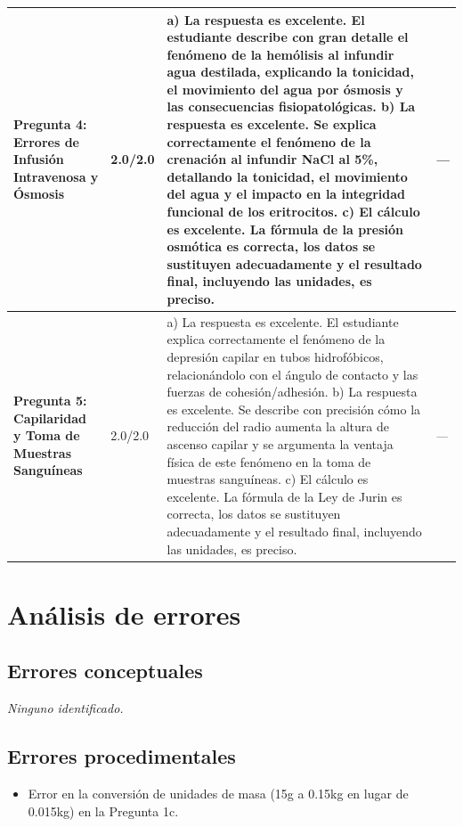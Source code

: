 \documentclass[11pt,a4paper]{article}
\begin{document}
\begin{longtable}{>{\bfseries}p{2.8cm} p{1.6cm} p{7.0cm} p{2.8cm}}
    \midrule
    \textbf{Pregunta 4: Errores de Infusión Intravenosa y Ósmosis} & 2.0/2.0 & a) La respuesta es excelente. El estudiante describe con gran detalle el fenómeno de la hemólisis al infundir agua destilada, explicando la tonicidad, el movimiento del agua por ósmosis y las consecuencias fisiopatológicas. 
b) La respuesta es excelente. Se explica correctamente el fenómeno de la crenación al infundir NaCl al 5\%, detallando la tonicidad, el movimiento del agua y el impacto en la integridad funcional de los eritrocitos. 
c) El cálculo es excelente. La fórmula de la presión osmótica es correcta, los datos se sustituyen adecuadamente y el resultado final, incluyendo las unidades, es preciso. & \textit{---} \\
    \midrule
    \textbf{Pregunta 5: Capilaridad y Toma de Muestras Sanguíneas} & 2.0/2.0 & a) La respuesta es excelente. El estudiante explica correctamente el fenómeno de la depresión capilar en tubos hidrofóbicos, relacionándolo con el ángulo de contacto y las fuerzas de cohesión/adhesión. 
b) La respuesta es excelente. Se describe con precisión cómo la reducción del radio aumenta la altura de ascenso capilar y se argumenta la ventaja física de este fenómeno en la toma de muestras sanguíneas. 
c) El cálculo es excelente. La fórmula de la Ley de Jurin es correcta, los datos se sustituyen adecuadamente y el resultado final, incluyendo las unidades, es preciso. & \textit{---} \\
    \midrule
\end{longtable}

\section*{Análisis de errores}

\subsection*{Errores conceptuales}
\textit{Ninguno identificado.}

\subsection*{Errores procedimentales}
\begin{itemize}[leftmargin=1.5em, itemsep=2pt]
  \item Error en la conversión de unidades de masa (15g a 0.15kg en lugar de 0.015kg) en la Pregunta 1c.
\end{itemize}
\end{document}
